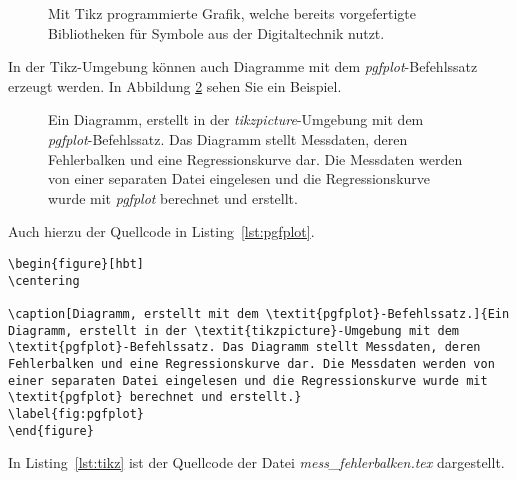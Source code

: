 \begin{figure}[hbt]
	\centering
	
	\caption[Mit Tikz programmierte Grafik, welche bereits vorgefertigte Bibliotheken für Symbole aus der Digitaltechnik nutzt.]{Mit Tikz programmierte Grafik, welche bereits vorgefertigte Bibliotheken für Symbole aus der Digitaltechnik nutzt.}
	\label{fig:tikz_digital}
\end{figure}


In der Tikz-Umgebung können auch Diagramme mit dem \textit{pgfplot}-Befehlssatz erzeugt werden. In Abbildung \ref{fig:pgfplot} sehen Sie ein Beispiel.

\begin{figure}[hbt]
	\centering
	
	\caption[Diagramm, erstellt mit dem \textit{pgfplot}-Befehlssatz.]{Ein Diagramm, erstellt in der \textit{tikzpicture}-Umgebung mit dem \textit{pgfplot}-Befehlssatz. Das Diagramm stellt Messdaten, deren Fehlerbalken und eine Regressionskurve dar. Die Messdaten werden von einer separaten Datei eingelesen und die Regressionskurve wurde mit \textit{pgfplot} berechnet und erstellt.}
	\label{fig:pgfplot}
\end{figure}

\clearpage

Auch hierzu der Quellcode in Listing~\ref{lst:pgfplot}.

\begin{lstlisting}[caption=Quellcode der Abbildung~\ref{fig:pgfplot}.,label=lst:pgfplot]
\begin{figure}[hbt]
\centering

\caption[Diagramm, erstellt mit dem \textit{pgfplot}-Befehlssatz.]{Ein Diagramm, erstellt in der \textit{tikzpicture}-Umgebung mit dem \textit{pgfplot}-Befehlssatz. Das Diagramm stellt Messdaten, deren Fehlerbalken und eine Regressionskurve dar. Die Messdaten werden von einer separaten Datei eingelesen und die Regressionskurve wurde mit \textit{pgfplot} berechnet und erstellt.}
\label{fig:pgfplot}
\end{figure}
\end{lstlisting}

In Listing~\ref{lst:tikz} ist der Quellcode der Datei \textit{mess\_fehlerbalken.tex} dargestellt.

